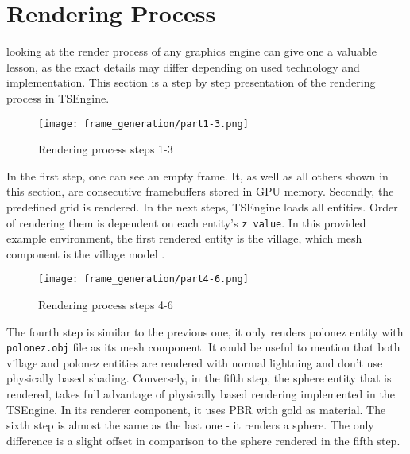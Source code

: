 \newpage
\section{Rendering Process}
\label{sec:rendering_process}
\hspace{\parindent}
looking at the render process of any graphics engine can give one a valuable lesson, as the exact details may differ depending on used technology and implementation. This section is a step by step presentation of the rendering process in TSEngine.\\
\begin{figure}[H]
  \texttt{[image: frame\_generation/part1-3.png]}
  \caption{Rendering process steps 1-3}
\end{figure}
In the first step, one can see an empty frame. It, as well as all others shown in this section, are consecutive framebuffers stored in GPU memory.
Secondly, the predefined grid is rendered.
In the next steps, TSEngine loads all entities. Order of rendering them is dependent on each entity's \texttt{z value}. In this provided example environment, the first rendered entity is the village, which mesh component is the village model \cite{VillageModel}.

\begin{figure}[H]
  \texttt{[image: frame\_generation/part4-6.png]}
  \caption{Rendering process steps 4-6}
\end{figure}
The fourth step is similar to the previous one, it only renders polonez entity with \texttt{polonez.obj} file as its mesh component. It could be useful to mention that both village and polonez entities are rendered with normal lightning and don't use physically based shading.
Conversely, in the fifth step, the sphere entity that is rendered, takes full advantage of physically based rendering implemented in the TSEngine. In its renderer component, it uses PBR with gold as material. 
The sixth step is almost the same as the last one - it renders a sphere. The only difference is a slight offset in comparison to the sphere rendered in the fifth step.

